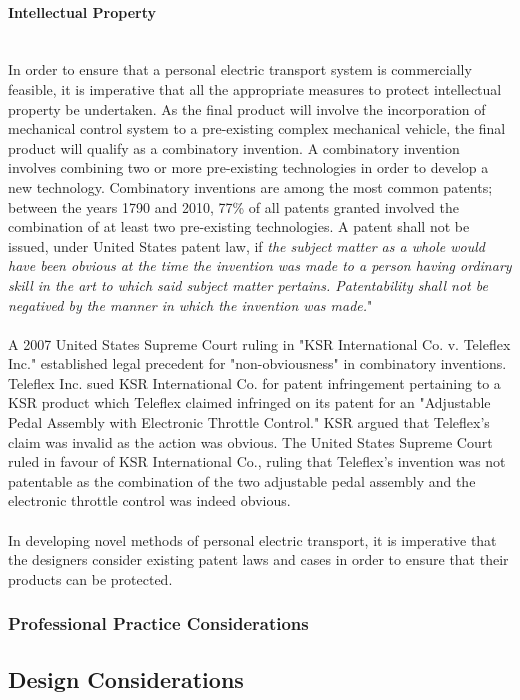 \paragraph{Intellectual Property}\mbox{}\\
In order to ensure that a personal electric transport system is commercially feasible, it is imperative that all the appropriate measures to protect intellectual property be undertaken. 
As the final product will involve the incorporation of mechanical control system to a pre-existing complex mechanical vehicle, the final product will qualify as a combinatory invention. 
A combinatory invention involves combining two or more pre-existing technologies in order to develop a new technology. 
Combinatory inventions are among the most common patents; between the years 1790 and 2010, 77\% of all patents granted involved the combination of at least two pre-existing technologies. \cite{COMB} 
A patent shall not be issued, under United States patent law, if \emph{the subject matter as a whole would have been obvious at the time the invention was made to a person having ordinary skill in the art to which said subject matter pertains. 
	Patentability shall not be negatived by the manner in which the invention was made.}" \cite{NonObv} 
\\
\\
A 2007 United States Supreme Court ruling in "KSR International Co. v. Teleflex Inc." established legal precedent for "non-obviousness" in combinatory inventions. 
Teleflex Inc. sued KSR International Co. for patent infringement pertaining to a KSR product which Teleflex claimed infringed on its patent for an "Adjustable Pedal Assembly with Electronic Throttle Control."
KSR argued that Teleflex's claim was invalid as the action was obvious. 
The United States Supreme Court ruled in favour of KSR International Co.,  
ruling that Teleflex's invention was not patentable as the combination of the two adjustable pedal assembly and the electronic throttle control was indeed obvious. 
\\
\\
In developing novel methods of personal electric transport, it is imperative that the designers consider existing patent laws and cases in order to ensure that their products can be protected.

\subsubsection{Professional Practice Considerations}
\subsection{Design Considerations}
